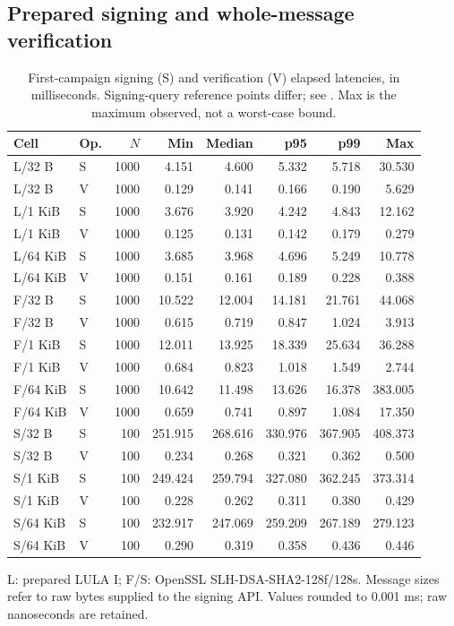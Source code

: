 \subsection{Prepared signing and whole-message verification}
\begin{table}[t]
\caption{First-campaign signing (S) and verification (V) elapsed latencies, in milliseconds. Signing-query reference points differ; see . Max is the maximum observed, not a worst-case bound.}\label{tab:comparison-latencies}
\centering\small\setlength{\tabcolsep}{3pt}
\begin{tabular}{llrrrrrr}\toprule
Cell & Op. & $N$ & Min & Median & p95 & p99 & Max\\\midrule
L/32 B & S & 1000 & 4.151 & 4.600 & 5.332 & 5.718 & 30.530\\
L/32 B & V & 1000 & 0.129 & 0.141 & 0.166 & 0.190 & 5.629\\
L/1 KiB & S & 1000 & 3.676 & 3.920 & 4.242 & 4.843 & 12.162\\
L/1 KiB & V & 1000 & 0.125 & 0.131 & 0.142 & 0.179 & 0.279\\
L/64 KiB & S & 1000 & 3.685 & 3.968 & 4.696 & 5.249 & 10.778\\
L/64 KiB & V & 1000 & 0.151 & 0.161 & 0.189 & 0.228 & 0.388\\
F/32 B & S & 1000 & 10.522 & 12.004 & 14.181 & 21.761 & 44.068\\
F/32 B & V & 1000 & 0.615 & 0.719 & 0.847 & 1.024 & 3.913\\
F/1 KiB & S & 1000 & 12.011 & 13.925 & 18.339 & 25.634 & 36.288\\
F/1 KiB & V & 1000 & 0.684 & 0.823 & 1.018 & 1.549 & 2.744\\
F/64 KiB & S & 1000 & 10.642 & 11.498 & 13.626 & 16.378 & 383.005\\
F/64 KiB & V & 1000 & 0.659 & 0.741 & 0.897 & 1.084 & 17.350\\
S/32 B & S & 100 & 251.915 & 268.616 & 330.976 & 367.905 & 408.373\\
S/32 B & V & 100 & 0.234 & 0.268 & 0.321 & 0.362 & 0.500\\
S/1 KiB & S & 100 & 249.424 & 259.794 & 327.080 & 362.245 & 373.314\\
S/1 KiB & V & 100 & 0.228 & 0.262 & 0.311 & 0.380 & 0.429\\
S/64 KiB & S & 100 & 232.917 & 247.069 & 259.209 & 267.189 & 279.123\\
S/64 KiB & V & 100 & 0.290 & 0.319 & 0.358 & 0.436 & 0.446\\
\bottomrule\end{tabular}
\smallskip\par\raggedright\footnotesize L: prepared LULA I; F/S: OpenSSL SLH-DSA-SHA2-128f/128s. Message sizes refer to raw bytes supplied to the signing API. Values rounded to 0.001 ms; raw nanoseconds are retained.
\end{table}
